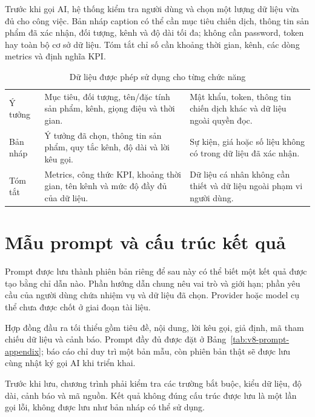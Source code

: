 Trước khi gọi AI, hệ thống kiểm tra người dùng và chọn một lượng dữ liệu vừa đủ cho công việc. Bản nháp caption có thể cần mục tiêu chiến dịch, thông tin sản phẩm đã xác nhận, đối tượng, kênh và độ dài tối đa; không cần password, token hay toàn bộ cơ sở dữ liệu. Tóm tắt chỉ số cần khoảng thời gian, kênh, các dòng metrics và định nghĩa KPI.

\begin{table}[h!]
\centering
\small
\caption{Dữ liệu được phép sử dụng cho từng chức năng}
\label{tab:v8-ai-context}
\begin{tabularx}{\textwidth}{|L{2.8cm}|Y|Y|}
\hline
{} &  & \\
\hline
Ý tưởng & Mục tiêu, đối tượng, tên/đặc tính sản phẩm, kênh, giọng điệu và thời gian. & Mật khẩu, token, thông tin chiến dịch khác và dữ liệu ngoài quyền đọc.\\
\hline
Bản nháp & Ý tưởng đã chọn, thông tin sản phẩm, quy tắc kênh, độ dài và lời kêu gọi. & Sự kiện, giá hoặc số liệu không có trong dữ liệu đã xác nhận.\\
\hline
Tóm tắt & Metrics, công thức KPI, khoảng thời gian, tên kênh và mức độ đầy đủ của dữ liệu. & Dữ liệu cá nhân không cần thiết và dữ liệu ngoài phạm vi người dùng.\\
\hline
\end{tabularx}
\end{table}

\section{Mẫu prompt và cấu trúc kết quả}

Prompt được lưu thành phiên bản riêng để sau này có thể biết một kết quả được tạo bằng chỉ dẫn nào. Phần hướng dẫn chung nêu vai trò và giới hạn; phần yêu cầu của người dùng chứa nhiệm vụ và dữ liệu đã chọn. Provider hoặc model cụ thể chưa được chốt ở giai đoạn tài liệu.

Hợp đồng đầu ra tối thiểu gồm tiêu đề, nội dung, lời kêu gọi, giả định, mã tham chiếu dữ liệu và cảnh báo. Prompt đầy đủ được đặt ở Bảng~\ref{tab:v8-prompt-appendix}; báo cáo chỉ duy trì một bản mẫu, còn phiên bản thật sẽ được lưu cùng nhật ký gọi AI khi triển khai.

Trước khi lưu, chương trình phải kiểm tra các trường bắt buộc, kiểu dữ liệu, độ dài, cảnh báo và mã nguồn. Kết quả không đúng cấu trúc được lưu là một lần gọi lỗi, không được lưu như bản nháp có thể sử dụng.


